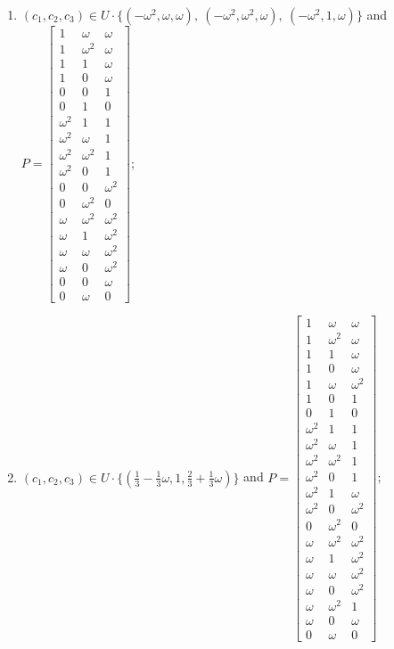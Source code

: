 \begin{enumerate}
\item[(f94)\,\newitem] $(c_1,c_2,c_3)\in U\cdot\{(-\omega^2,\omega,\omega),\allowbreak\ (-\omega^2,\omega^2,\omega),\allowbreak\ (-\omega^2,1,\omega)\}$ and $P=\begin{bmatrix}1&\omega&\omega\\1&\omega^2&\omega\\1&1&\omega\\1&0&\omega\\0&0&1\\0&1&0\\\omega^2&1&1\\\omega^2&\omega&1\\\omega^2&\omega^2&1\\\omega^2&0&1\\0&0&\omega^2\\0&\omega^2&0\\\omega&\omega^2&\omega^2\\\omega&1&\omega^2\\\omega&\omega&\omega^2\\\omega&0&\omega^2\\0&0&\omega\\0&\omega&0\end{bmatrix}$;
\item[(f95)\,\newitem] $(c_1,c_2,c_3)\in U\cdot\{(\tfrac{1}{3}-\tfrac{1}{3}\omega,1,\tfrac{2}{3}+\tfrac{1}{3}\omega)\}$ and $P=\begin{bmatrix}1&\omega&\omega\\1&\omega^2&\omega\\1&1&\omega\\1&0&\omega\\1&\omega&\omega^2\\1&0&1\\0&1&0\\\omega^2&1&1\\\omega^2&\omega&1\\\omega^2&\omega^2&1\\\omega^2&0&1\\\omega^2&1&\omega\\\omega^2&0&\omega^2\\0&\omega^2&0\\\omega&\omega^2&\omega^2\\\omega&1&\omega^2\\\omega&\omega&\omega^2\\\omega&0&\omega^2\\\omega&\omega^2&1\\\omega&0&\omega\\0&\omega&0\end{bmatrix}$;

\end{enumerate}
